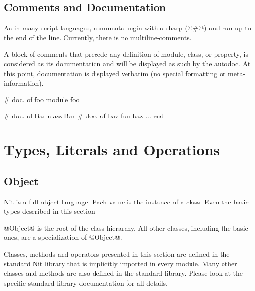 \subsection{Comments and Documentation}\label{comment}

As in many script languages, comments begin with a sharp (@#@) and run up to the end of the line.
Currently, there is no multiline-comments.

A block of comments that precede any definition of module, class, or property, is considered as its documentation and will be displayed as such by the autodoc.
At this point, documentation is displayed verbatim (no special formatting or meta-information).

\begin{lst}
# doc. of foo
module foo

# doc. of Bar
class Bar
	# doc. of baz
	fun baz ...
end
\end{lst}

\section{Types, Literals and Operations}

\subsection{Object}\label{Object}

Nit is a full object language.
Each value is the instance of a class.
Even the basic types described in this section.

@Object@ is the root of the class hierarchy.
All other classes, including the basic ones, are a specialization of @Object@.

Classes, methods and operators presented in this section are defined in the standard Nit library that is implicitly imported in every module.
Many other classes and methods are also defined in the standard library.
Please look at the specific standard library documentation for all details.

